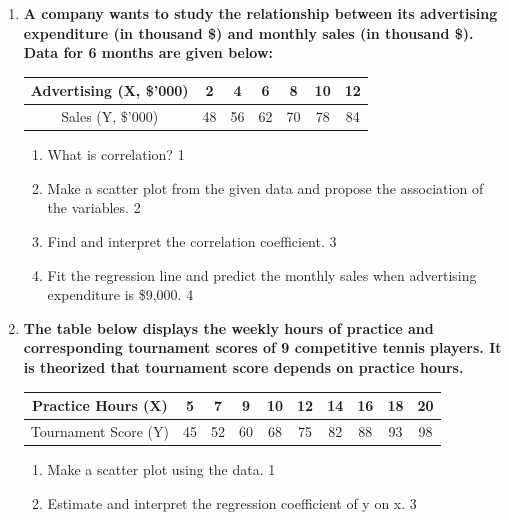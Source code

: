 \documentclass[a4paper,oneside]{book}
\begin{document}
\begin{enumerate}
\begin{enumerate}
\begin{enumerate}
    \item
    Estimate the regression coefficient of x on y. Is this model realistic? Explain. \hfill 4
\end{enumerate}

\item
  \textbf{A company wants to study the relationship between its advertising expenditure (in thousand \$) and monthly sales (in thousand \$). Data for 6 months are given below:}

\begin{table}[h!]
\centering
\begin{tabular}{c|c|c|c|c|c|c}
Advertising (X, \$'000) & 2 & 4 & 6 & 8 & 10 & 12 \\ \hline
Sales (Y, \$'000) & 48 & 56 & 62 & 70 & 78 & 84 \\
\end{tabular}
\end{table}

\begin{enumerate}
    \item What is correlation? \hfill 1
    \item Make a scatter plot from the given data and propose the association of the variables. \hfill 2
    \item
    Find and interpret the correlation coefficient. \hfill 3
    
    \item
    Fit the regression line and predict the monthly sales when advertising expenditure is \$9,000. \hfill 4
\end{enumerate}

\item
  \textbf{The table below displays the weekly hours of practice and corresponding tournament scores of 9 competitive tennis players. It is theorized that tournament score depends on practice hours.}

\begin{table}[h!]
\centering
\begin{tabular}{c|c|c|c|c|c|c|c|c|c}
Practice Hours (X) & 5 & 7 & 9 & 10 & 12 & 14 & 16 & 18 & 20 \\ \hline
Tournament Score (Y) & 45 & 52 & 60 & 68 & 75 & 82 & 88 & 93 & 98 \\
\end{tabular}
\end{table}

\begin{enumerate}
    \item Make a scatter plot using the data. \hfill 1
    \item
    Estimate and interpret the regression coefficient of y on x. \hfill 3
    

\end{enumerate}
\end{enumerate}
\end{enumerate}
\end{document}
